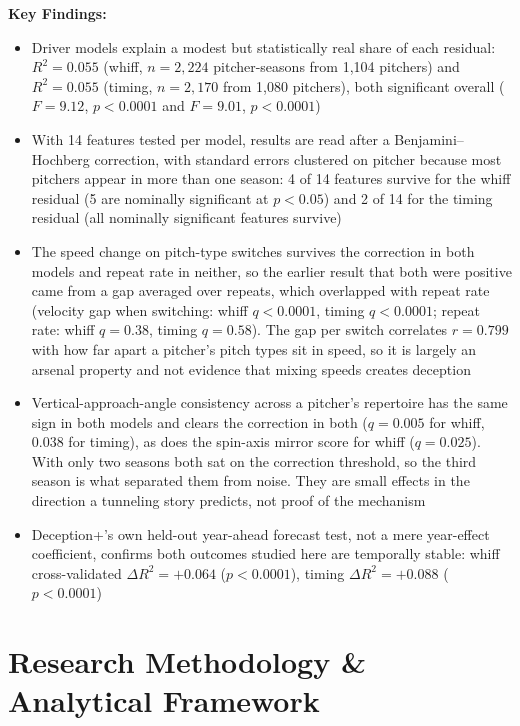 \documentclass[11pt]{article}
\begin{document}
\textbf{Key Findings:}
\begin{itemize}
\item Driver models explain a modest but statistically real share of each residual: $R^2 = 0.055$ (whiff, $n=2,224$ pitcher-seasons from 1,104 pitchers) and $R^2 = 0.055$ (timing, $n=2,170$ from 1,080 pitchers), both significant overall ($F=9.12$, $p<0.0001$ and $F=9.01$, $p<0.0001$)
\item With 14 features tested per model, results are read after a Benjamini--Hochberg correction, with standard errors clustered on pitcher because most pitchers appear in more than one season: 4 of 14 features survive for the whiff residual (5 are nominally significant at $p<0.05$) and 2 of 14 for the timing residual (all nominally significant features survive)
\item The speed change on pitch-type switches survives the correction in both models and repeat rate in neither, so the earlier result that both were positive came from a gap averaged over repeats, which overlapped with repeat rate (velocity gap when switching: whiff $q<0.0001$, timing $q<0.0001$; repeat rate: whiff $q=0.38$, timing $q=0.58$). The gap per switch correlates $r=0.799$ with how far apart a pitcher's pitch types sit in speed, so it is largely an arsenal property and not evidence that mixing speeds creates deception
\item Vertical-approach-angle consistency across a pitcher's repertoire has the same sign in both models and clears the correction in both ($q=0.005$ for whiff, $0.038$ for timing), as does the spin-axis mirror score for whiff ($q=0.025$). With only two seasons both sat on the correction threshold, so the third season is what separated them from noise. They are small effects in the direction a tunneling story predicts, not proof of the mechanism
\item Deception+'s own held-out year-ahead forecast test, not a mere year-effect coefficient, confirms both outcomes studied here are temporally stable: whiff cross-validated $\Delta R^2=+0.064$ ($p<0.0001$), timing $\Delta R^2=+0.088$ ($p<0.0001$)
\end{itemize}

\section*{Research Methodology \& Analytical Framework}
\end{document}
